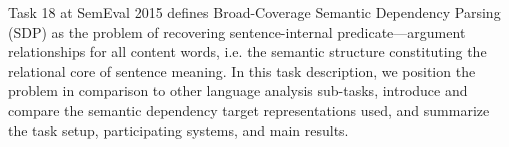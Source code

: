Task 18 at SemEval 2015 defines Broad-Coverage Semantic Dependency Parsing (SDP) as the problem of recovering sentence-internal predicate---argument relationships for all content words, i.e. the semantic structure constituting the relational core of sentence meaning.  In this task description, we position the problem in comparison to other language analysis sub-tasks, introduce and compare the semantic dependency target representations used, and summarize the task setup, participating systems, and main results.

